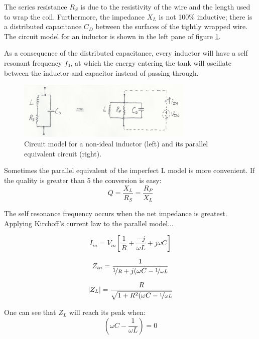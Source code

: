 \documentclass[titlepage, letterpaper, 10.5pt]{article}
\begin{document}
The series resistance $R_{S}$ is due to the resistivity of the
wire and the length used to wrap the coil. Furthermore, the
impedance $X_{L}$ is not 100\% inductive; there is a distributed
capacitance $C_{D}$ between the surfaces of the tightly wrapped
wire. The circuit model for an inductor is shown in the left pane of
figure \ref{tankCircuit}.

As a consequence of the distributed capacitance, every inductor
will have a self resonant frequency $f_{0}$, at which the energy
entering the tank will oscillate between the inductor and capacitor
instead of passing through.

\begin{figure}[ht]
	\centering
	\includegraphics[width=0.75\textwidth]
		{figures/tankCircuit.png}
	\caption{
		Circuit model for a non-ideal inductor (left) and its
		parallel equivalent circuit (right).
	}
	\label{tankCircuit}
\end{figure}

Sometimes the parallel equivalent of the imperfect L model is more
convenient. If the quality is greater than 5 the conversion is easy:
\begin{equation}
Q=\frac{X_{L}}{R_{S}}=\frac{R_{P}}{X_{L}}
\end{equation}

The self resonance frequency occurs when the net impedance is
greatest. Applying Kirchoff's current law to the parallel model...

\begin{equation*}
I_{in}=V_{in}\left[
\frac{1}{R}+\frac{-j}{\omega L}+j\omega C\right]
\end{equation*}

\begin{equation*}
Z_{in}=\frac{1}{\nicefrac{1}{R}+j(\omega C-\nicefrac{1}{\omega L}}
\end{equation*}

\begin{equation}
|Z_{L}|=\frac{R}{\sqrt{1+R^{2}(\omega C-\nicefrac{1}{\omega L}}}
\label{tankImpedance}
\end{equation}

One can see that $Z_{L}$ will reach its peak when:
\begin{equation*}
\left(\omega C-\frac{1}{\omega L}\right)=0
\label{resonantFrequencyEq}
\end{equation*}
\end{document}
